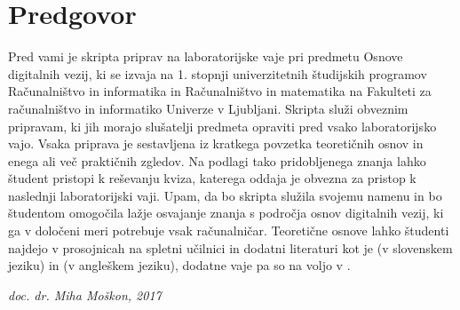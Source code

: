 \chapter*{Predgovor}

Pred vami je skripta priprav na laboratorijske vaje pri predmetu Osnove digitalnih vezij, ki se izvaja na 1. stopnji univerzitetnih študijskih programov Računalništvo in informatika in Računalništvo in matematika na Fakulteti za računalništvo in informatiko Univerze v Ljubljani. Skripta služi obveznim pripravam, ki jih morajo slušatelji predmeta opraviti pred vsako laboratorijsko vajo. Vsaka priprava je sestavljena iz kratkega povzetka teoretičnih osnov in enega ali več praktičnih zgledov. Na podlagi tako pridobljenega znanja lahko študent pristopi k reševanju kviza, katerega oddaja je obvezna za pristop k naslednji laboratorijski vaji. Upam, da bo skripta služila svojemu namenu in bo študentom omogočila lažje osvajanje znanja s področja osnov digitalnih vezij, ki ga v določeni meri potrebuje vsak računalničar. Teoretične osnove lahko študenti najdejo v prosojnicah na spletni učilnici in dodatni literaturi kot je \cite{virant:1996} (v slovenskem jeziku) in \cite{tocci:2010} (v angleškem jeziku), dodatne vaje pa so na voljo v \cite{bajec:2002,trebar:1992}.

\begin{flushright}
\textit{doc. dr. Miha Moškon, 2017}
\end{flushright}
